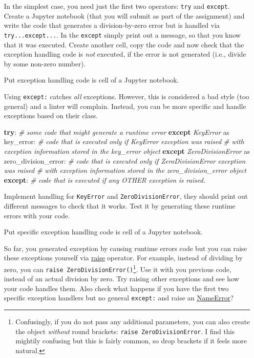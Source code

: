 \documentclass[
]{book}
\newenvironment{Shaded}{\begin{snugshade}}{\end{snugshade}}
\newcommand{\CommentTok}[1]{\textcolor[rgb]{0.56,0.35,0.01}{\textit{#1}}}
\newcommand{\ControlFlowTok}[1]{\textcolor[rgb]{0.13,0.29,0.53}{\textbf{#1}}}
\newcommand{\ImportTok}[1]{#1}
\newcommand{\NormalTok}[1]{#1}
\newcommand{\PreprocessorTok}[1]{\textcolor[rgb]{0.56,0.35,0.01}{\textit{#1}}}
\begin{document}
In the simplest case, you need just the first two operators: \texttt{try} and \texttt{except}. Create a Jupyter notebook (that you will submit as part of the assignment) and write the code that generates a division-by-zero error but is handled via \texttt{try...except...}. In the \texttt{except} simply print out a message, so that you know that it was executed. Create another cell, copy the code and now check that the exception handling code is \emph{not} executed, if the error is not generated (i.e., divide by some non-zero number).

Put exception handling code is cell of a Jupyter notebook.

Using \texttt{except:} catches \emph{all} exceptions. However, this is considered a bad style (too general) and a linter will complain. Instead, you can be more specific and handle exceptions based on their class.

\begin{Shaded}
\begin{Highlighting}[]
\ControlFlowTok{try}\NormalTok{:}
    \CommentTok{\# some code that might generate a runtime error}
\ControlFlowTok{except} \PreprocessorTok{KeyError} \ImportTok{as}\NormalTok{ key\_error:}
    \CommentTok{\# code that is executed only if KeyError exception was raised }
    \CommentTok{\# with exception information stored in the key\_error object}
\ControlFlowTok{except} \PreprocessorTok{ZeroDivisionError} \ImportTok{as}\NormalTok{ zero\_division\_error:  }
    \CommentTok{\# code that is executed only if ZeroDivisionError exception was raised}
    \CommentTok{\# with exception information stored in the zero\_division\_error object}
\ControlFlowTok{except}\NormalTok{:}
    \CommentTok{\# code that is executed if any OTHER exception is raised.}
\end{Highlighting}
\end{Shaded}

Implement handling for \texttt{KeyError} and \texttt{ZeroDivisionError}, they should print out different messages to check that it works. Test it by generating these runtime errors with your code.

Put specific exception handling code is cell of a Jupyter notebook.

So far, you generated exception by causing runtime errors code but you can raise these exceptions yourself via \href{https://docs.python.org/3/reference/simple_stmts.html\#the-raise-statement}{raise} operator. For example, instead of dividing by zero, you can \texttt{raise\ ZeroDivisionError()}\footnote{Confusingly, if you do not pass any additional parameters, you can also create the object \emph{without} round brackets: \texttt{raise\ ZeroDivisionError}. I find this mightily confusing but this is fairly common, so drop brackets if it feels more natural.}. Use it with you previous code, instead of an actual division by zero. Try raising other exceptions and see how your code handles them. Also check what happens if you have the first two specific exception handlers but no general \texttt{except:} and raise an \href{https://docs.python.org/3/library/exceptions.html\#NameError}{NameError}?
\end{document}
